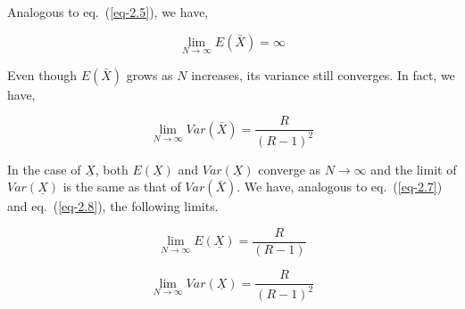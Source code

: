 \begin{multicols}{2}
Analogous to eq.~(\ref{eq-2.5}), we have,

\begin{thm} \label{thm-4.1}
\begin{equation*}
\lim_{N \rightarrow \infty} E(\bar{X}) = \infty
\end{equation*}
\end{thm}
Even though $E(\bar{X})$ grows as $N$ increases, its variance still converges. In fact, we have,\\ 
 \begin{thm}\label{thm-4.2}
\begin{equation*}
\lim_{N \rightarrow \infty} Var(\bar{X}) = \frac{R}{(R-1)^2}
\end{equation*}
 \end{thm}

\vspace{-.2cm} 
 
In the case of $\underline{X} $, both $E(\underline{X})$ and $Var(\underline{X})$ converge as $N \rightarrow \infty$ and the limit of $Var(\underline{X})$ is the same as that of $Var(\bar{X})$. We have, analogous to eq.~(\ref{eq-2.7}) and eq.~(\ref{eq-2.8}), the following limits.
\begin{thm}
 \label{thm-4.3}
\begin{equation}\nonumber
\lim_{N \rightarrow \infty} E(\underline{X}) = \frac{R}{(R-1)}
\end{equation}
 \end{thm}
 \begin{thm}\label{thm-4.4}
\begin{equation}\nonumber
\lim_{N \rightarrow \infty} Var(\underline{X}) = \frac{R}{(R-1)^2}
\end{equation}
 \end{thm}
 
 \vspace{-.3cm}
 

\end{multicols}

